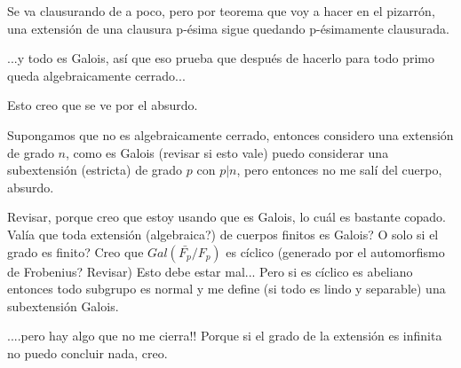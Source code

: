 \documentclass[10pt,spanish]{beamer}
\begin{document}
\begin{frame}




Se va clausurando de a poco, pero por teorema que voy a hacer en el pizarrón, una extensión de una clausura p-ésima sigue quedando p-ésimamente clausurada.

...y todo es Galois, así que eso prueba que después de hacerlo para todo primo queda algebraicamente cerrado...

Esto creo que se ve por el absurdo.

Supongamos que no es algebraicamente cerrado, entonces considero una extensión de grado $n$, como es Galois (revisar si esto vale) puedo considerar una subextensión (estricta) de grado $p$ con $p|n$, pero entonces no me salí del cuerpo, absurdo.

Revisar, porque creo que estoy usando que es Galois, lo cuál es bastante copado. Valía que toda extensión (algebraica?) de cuerpos finitos es Galois? O solo si el grado es finito? Creo que $Gal(\bar{F_p}/F_p)$ es cíclico (generado por el automorfismo de Frobenius? Revisar) Esto debe estar mal... Pero si es cíclico es abeliano entonces todo subgrupo es normal y me define (si todo es lindo y separable) una subextensión Galois.

....pero hay algo que no me cierra!! Porque si el grado de la extensión es infinita no puedo concluir nada, creo.


\end{frame}
\end{document}
